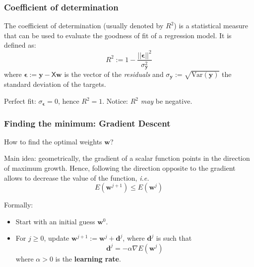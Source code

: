 \documentclass{beamer}
\begin{document}
	\begin{frame}
		\frametitle{Coefficient of determination}		
		
		The coefficient of determination (usually denoted by $R^2$) is a statistical measure that can be used to evaluate the goodness of fit of a regression model. It is defined as:
		\begin{equation*}
			R^2 := 1 - \frac{||\bm{\epsilon}||^2}{\sigma_{\bm{y}}^2}
		\end{equation*}
		where $\bm{\epsilon} := \bm{y} - \mathsf{X}\bm{w}$ is the vector of the \textit{residuals} and $\sigma_{\bm{y}}:= \sqrt{\text{Var}(\bm{y})}$ the standard deviation of the targets. 
		
		\vspace{5mm}
		
		Perfect fit: $\sigma_{\bm{\epsilon}} = 0$, hence $R^2 = 1$. Notice: $R^2$ \textit{may} be negative.
		
	\end{frame}

	\begin{frame}
		\frametitle{Finding the minimum: Gradient Descent}
		How to find the optimal weights $\bm{w}$?
		
		\vspace{5mm}
		
		Main idea: geometrically, the gradient of a scalar function points in the direction of maximum growth. Hence, following the direction opposite to the gradient allows to decrease the value of the function, \textit{i.e.}
		\begin{equation*}
			E(\bm{w}^{j+1}) \leq E(\bm{w}^j) 
		\end{equation*}
		
		\vspace{5mm}
		
		Formally:
		\begin{itemize}
			\item Start with an initial guess $\bm{w}^0$.
			\item For $j \geq 0$, update $\bm{w}^{j+1} := \bm{w}^{j} + \bm{d}^j$, where $\bm{d}^j$ is such that
			$$\bm{d}^j = - \alpha \nabla E(\bm{w}^j)$$
			where $\alpha>0$ is the \textbf{learning rate}.
		\end{itemize}
	
	\end{frame}
\end{document}
